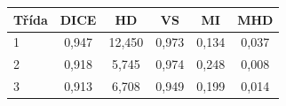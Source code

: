 \begin{tabular}{l c c c c c}
 \hline
Třída & DICE & HD & VS & MI & MHD \\ \hline
1 & 0,947 & 12,450 & 0,973 & 0,134 & 0,037 \\
2 & 0,918 & 5,745 & 0,974 & 0,248 & 0,008 \\
3 & 0,913 & 6,708 & 0,949 & 0,199 & 0,014 \\
\hline 
 \end{tabular}
